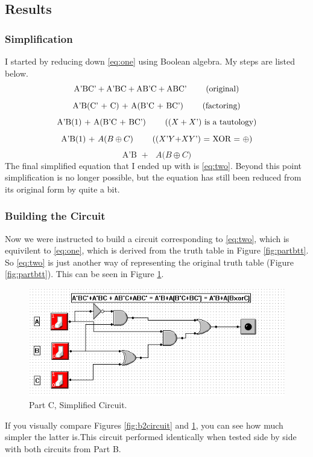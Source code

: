 \documentclass[a4paper,11pt]{article}
\begin{document}
\subsection{Results}
\subsubsection{Simplification}
I started by reducing down \eqref{eq:one} using Boolean algebra. My steps are listed below.
 \[ \text{A'BC'} + \text{A'BC} + \text{AB'C} + \text{ABC' \qquad  (original)} \]
 \[ \text{A'B(C' $+$ C) $+$ A(B'C $+$ BC') \qquad (factoring)} \]
 \[ \text{A'B(1) $+$ A(B'C $+$ BC')  \qquad (($X+X$') is a tautology)} \]
 \[ \text{A'B(1) $+$ $A$($B \oplus C$)  \qquad (($X$'$Y$+$XY$') $=$ XOR = $\oplus$)} \]
\begin{equation} \label{eq:two} \text{A'B $+$ $A$($B \oplus C$)} \end{equation}
The final simplified equation that I ended up with is \eqref{eq:two}. Beyond this point simplification is no longer possible, but the equation has still been reduced from its original form by quite a bit.

\subsubsection{Building the Circuit}
Now we were instructed to build a circuit corresponding to \eqref{eq:two}, which is equivilent to \eqref{eq:one}, which is derived from the truth table in Figure \ref{fig:partbtt}. So \eqref{eq:two} is just another way of representing the original truth table (Figure \ref{fig:partbtt}). This can be seen in Figure \ref{fig:partc}.
 \begin{figure}[h!]
   \centering
     \includegraphics[width=6.5in]{partc}
   \caption{Part C, Simplified Circuit.}
   \label{fig:partc}
\end{figure}   
If you visually compare Figures \ref{fig:b2circuit} and \ref{fig:partc}, you can see how much simpler the latter is.This circuit performed identically when tested side by side with both circuits from Part B. 
\end{document}
